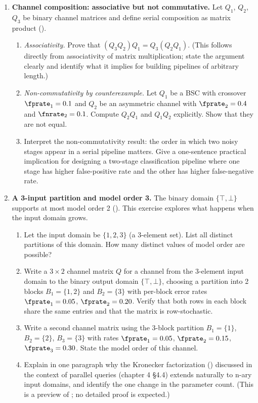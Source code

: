 \begin{enumerate}
\item \exstarstarstar
\textbf{Channel composition: associative but not commutative.}
Let $Q_1$, $Q_2$, $Q_3$ be binary channel matrices and define serial
composition as matrix product ().
\begin{enumerate}
  \item[(a)] \textit{Associativity.} Prove that
    $(Q_3 Q_2) Q_1 = Q_3 (Q_2 Q_1)$.
    (This follows directly from associativity of matrix multiplication;
    state the argument clearly and identify what it implies for building
    pipelines of arbitrary length.)
  \item[(b)] \textit{Non-commutativity by counterexample.}
    Let $Q_1$ be a BSC with crossover $\fprate_1 = 0.1$ and $Q_2$ be an
    asymmetric channel with $\fprate_2 = 0.4$ and $\fnrate_2 = 0.1$.
    Compute $Q_2 Q_1$ and $Q_1 Q_2$ explicitly. Show that they are not equal.
  \item[(c)] Interpret the non-commutativity result: the order in which
    two noisy stages appear in a serial pipeline matters. Give a one-sentence
    practical implication for designing a two-stage classification pipeline
    where one stage has higher false-positive rate and the other has higher
    false-negative rate.
\end{enumerate}

\item \exstarstarstar
\textbf{A 3-input partition and model order 3.}
The binary domain $\{\top, \bot\}$ supports at most model order 2
(). This exercise explores what happens when the
input domain grows.
\begin{enumerate}
  \item[(a)] Let the input domain be $\{1, 2, 3\}$ (a 3-element set). List
    all distinct partitions of this domain. How many distinct values of model
    order are possible?
  \item[(b)] Write a $3 \times 2$ channel matrix $Q$ for a channel from the
    3-element input domain to the binary output domain $\{\top, \bot\}$,
    choosing a partition into 2 blocks $B_1 = \{1, 2\}$ and $B_2 = \{3\}$
    with per-block error rates $\fprate_1 = 0.05$, $\fprate_2 = 0.20$.
    Verify that both rows in each block share the same entries and that the
    matrix is row-stochastic.
  \item[(c)] Write a second channel matrix using the 3-block partition
    $B_1 = \{1\}$, $B_2 = \{2\}$, $B_3 = \{3\}$ with rates
    $\fprate_1 = 0.05$, $\fprate_2 = 0.15$, $\fprate_3 = 0.30$.
    State the model order of this channel.
  \item[(d)] Explain in one paragraph why the Kronecker factorization
    () discussed in the context of parallel queries
    (chapter 4 §4.4) extends naturally to n-ary input domains, and identify
    the one change in the parameter count. (This is a preview of
    ; no detailed proof is expected.)
\end{enumerate}

\end{enumerate}
